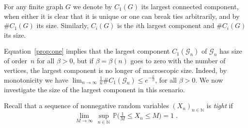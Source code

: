 \documentclass[12pt,a4paper]{article}
\numberwithin{equation}{section}
\begin{document}
For any finite graph $G$ we denote by $C_1(G)$ its largest connected component, when either it is clear that it is unique or one can break ties arbitrarily, and by $\#C_1(G)$ its size. 
Similarly, $C_i(G)$ is the $i$th largest component and 
$\#C_i(G)$ its size.\smallskip

Equation~\eqref{prop:one} implies that the largest component $C_1(\mathscr G_n)$ of $\mathscr G_n$ has size of order~$n$ for all $\beta>0$, but if $\beta=\beta(n)$ goes to zero with the number of vertices, the largest component is no longer of macroscopic size. Indeed, by monotonicity we have  $\lim_{n\to\infty}\frac1n \#C_1(\mathscr{G}_n) \leq e^{-\frac{c}{\beta}}$, for all $\beta>0$. We now investigate the size of the largest component in this scenario. \smallskip

Recall that a sequence of nonnegative random variables $(X_n)_{n\in\mathbb N}$ is \emph{tight} if
\begin{equation*}
    \lim_{M\to\infty }\, \sup_{n\in\mathbb N} \,\mathbb P \big( \tfrac{1}{M} \le X_n \le M \big)=1 \;.
\end{equation*}
\end{document}
